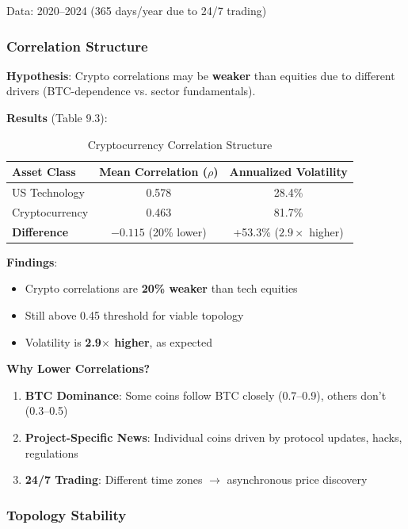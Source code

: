 Data: 2020--2024 (365 days/year due to 24/7 trading)

\subsubsection{Correlation Structure}

\textbf{Hypothesis}: Crypto correlations may be \textbf{weaker} than equities due to different drivers (BTC-dependence vs. sector fundamentals).

\textbf{Results} (Table 9.3):

\begin{table}[H]
\centering
\caption{Cryptocurrency Correlation Structure}
\label{tab:crypto-correlations}
\begin{tabular}{@{}lcc@{}}
\toprule
\textbf{Asset Class} & \textbf{Mean Correlation ($\rho$)} & \textbf{Annualized Volatility} \\
\midrule
US Technology & 0.578 & 28.4\% \\
Cryptocurrency & 0.463 & 81.7\% \\
\textbf{Difference} & $-0.115$ (20\% lower) & +53.3\% ($2.9\times$ higher) \\
\bottomrule
\end{tabular}
\end{table}

\textbf{Findings}:
\begin{itemize}
\item Crypto correlations are \textbf{20\% weaker} than tech equities
\item Still above 0.45 threshold for viable topology
\item Volatility is \textbf{2.9$\times$ higher}, as expected
\end{itemize}

\textbf{Why Lower Correlations?}
\begin{enumerate}
\item \textbf{BTC Dominance}: Some coins follow BTC closely (0.7--0.9), others don't (0.3--0.5)
\item \textbf{Project-Specific News}: Individual coins driven by protocol updates, hacks, regulations
\item \textbf{24/7 Trading}: Different time zones $\rightarrow$ asynchronous price discovery
\end{enumerate}

\subsubsection{Topology Stability}

